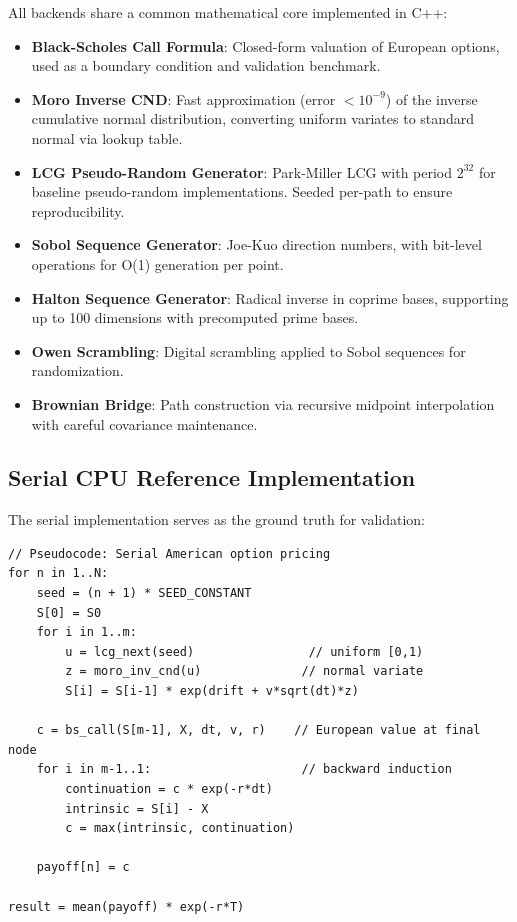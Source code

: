 \documentclass[11pt,a4paper]{article}
\begin{document}
All backends share a common mathematical core implemented in C++:

\begin{itemize}
    \item \textbf{Black-Scholes Call Formula}: Closed-form valuation of European options, used as a boundary condition and validation benchmark.
    \item \textbf{Moro Inverse CND}: Fast approximation (error $< 10^{-9}$) of the inverse cumulative normal distribution, converting uniform variates to standard normal via lookup table.
    \item \textbf{LCG Pseudo-Random Generator}: Park-Miller LCG with period $2^{32}$ for baseline pseudo-random implementations. Seeded per-path to ensure reproducibility.
    \item \textbf{Sobol Sequence Generator}: Joe-Kuo direction numbers, with bit-level operations for O(1) generation per point.
    \item \textbf{Halton Sequence Generator}: Radical inverse in coprime bases, supporting up to 100 dimensions with precomputed prime bases.
    \item \textbf{Owen Scrambling}: Digital scrambling applied to Sobol sequences for randomization.
    \item \textbf{Brownian Bridge}: Path construction via recursive midpoint interpolation with careful covariance maintenance.
\end{itemize}

\subsection{Serial CPU Reference Implementation}

The serial implementation serves as the ground truth for validation:

\begin{lstlisting}
// Pseudocode: Serial American option pricing
for n in 1..N:
    seed = (n + 1) * SEED_CONSTANT
    S[0] = S0
    for i in 1..m:
        u = lcg_next(seed)                // uniform [0,1)
        z = moro_inv_cnd(u)              // normal variate
        S[i] = S[i-1] * exp(drift + v*sqrt(dt)*z)
    
    c = bs_call(S[m-1], X, dt, v, r)    // European value at final node
    for i in m-1..1:                     // backward induction
        continuation = c * exp(-r*dt)
        intrinsic = S[i] - X
        c = max(intrinsic, continuation)
    
    payoff[n] = c

result = mean(payoff) * exp(-r*T)
\end{lstlisting}
\end{document}
